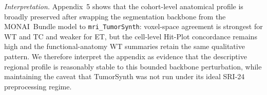 \documentclass[a4paper,11pt,leqno]{article}
\begin{document}
\noindent \textit{Interpretation.} Appendix~5 shows that the
cohort-level anatomical profile is broadly preserved after swapping
the segmentation backbone from the MONAI~Bundle model to
\texttt{mri\_TumorSynth}: voxel-space agreement is strongest for WT
and TC and weaker for ET, but the cell-level Hit-Plot concordance
remains high and the functional-anatomy WT summaries retain the same
qualitative pattern. We therefore interpret the appendix as evidence
that the descriptive regional profile is reasonably stable to this
bounded backbone perturbation, while maintaining the caveat that
TumorSynth was not run under its ideal SRI-24 preprocessing regime.
\end{document}
